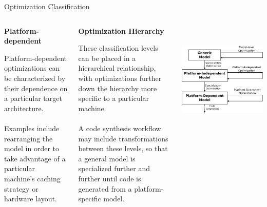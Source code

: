 \documentclass[final,hyperref={pdfpagelabels=false}]{beamer}
\begin{document}
\begin{frame}{}
\begin{block}{Optimization Classification}
\begin{columns}[t]
            \begin{column}{.16\linewidth}
            \small
          \begin{center}\textbf{Platform-dependent}\end{center}
          \footnotesize
            Platform-dependent optimizations can be characterized by their dependence on a particular target
            architecture. \\~\\Examples include rearranging the model in order to take advantage of a particular machine's
            caching strategy or hardware layout.
            \end{column}
            \hspace{-1.2cm}\vrule\hspace{.05cm}
            \begin{column}{.18\linewidth}
            \small
          \begin{center}\textbf{Optimization Hierarchy}\end{center}
          \footnotesize
            These classification levels can be placed in a hierarchical relationship, with optimizations
            further down the hierarchy more specific to a particular machine. \\~\\A code synthesis workflow may include transformations between these levels, so that a general model is specialized further and further until code is generated from a platform-specific model.
            \end{column}
            
            \begin{column}{.20\linewidth}
          ~\\~\\
            \includegraphics[width=\textwidth]{images/hierarchy}
            \end{column}
                        

\end{columns}
\end{block}
\end{frame}
\end{document}
